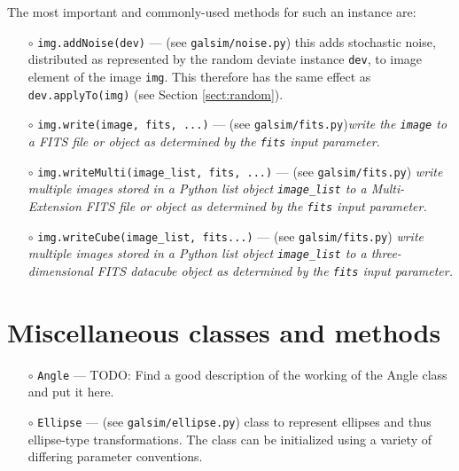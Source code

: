 \documentclass[preprint,11pt]{aastex}
\begin{document}
The most important and commonly-used methods for such an
instance are:
\begin{itemize}

\item[$\circ$] \texttt{img.addNoise(dev)} --- (see
  \texttt{galsim/noise.py}) this adds stochastic noise, distributed as
  represented by the random deviate instance \texttt{dev}, to image
  element of the image \texttt{img}.  This therefore has the same
  effect as \texttt{dev.applyTo(img)} (see Section \ref{sect:random}).

\item[$\circ$] \texttt{img.write(image, fits, ...)}  ---  (see
  \texttt{galsim/fits.py})\emph{write the \texttt{image} to a FITS
    file or object as determined by the \texttt{fits} input parameter.}

\item[$\circ$] \texttt{img.writeMulti(image\_list, fits, ...)} ---   (see
  \texttt{galsim/fits.py}) \emph{write multiple images stored in a
  Python list object \texttt{image\_list} to a Multi-Extension FITS
  file or object as determined by the \texttt{fits} input parameter.}

\item[$\circ$] \texttt{img.writeCube(image\_list, fits...)} ---   (see
  \texttt{galsim/fits.py}) \emph{write multiple images stored in a
  Python list object \texttt{image\_list} to a three-dimensional FITS
  datacube object as determined by the \texttt{fits} input parameter.}

\end{itemize}

\section{Miscellaneous classes and methods}\label{sect:misc}

\begin{itemize}

\item[$\circ$] \texttt{Angle} --- TODO: Find a good description of the
  working of the Angle class and put it here.

\item[$\circ$] \texttt{Ellipse} --- (see \texttt{galsim/ellipse.py})
  class to represent ellipses and thus ellipse-type transformations.
  The class can be initialized using a variety of differing parameter conventions.

\end{itemize}
\end{document}
